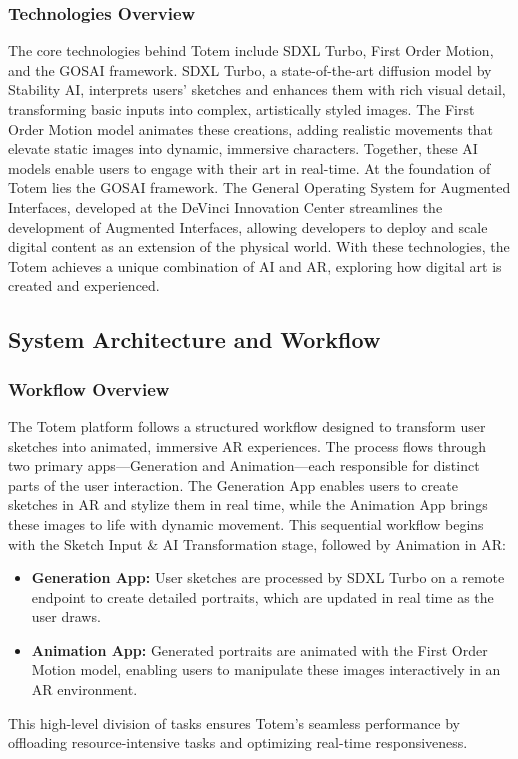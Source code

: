 \subsubsection{Technologies Overview}
The core technologies behind Totem include SDXL Turbo\cite{sauer2023adversarial}, First Order Motion\cite{Siarohin_2019_NeurIPS}, and the GOSAI framework\cite{gosai2022}.
SDXL Turbo, a state-of-the-art diffusion model by Stability AI, interprets users' sketches and enhances them with rich visual detail, transforming basic inputs into complex, artistically styled images.
The First Order Motion model animates these creations, adding realistic movements that elevate static images into dynamic, immersive characters.
Together, these AI models enable users to engage with their art in real-time.
At the foundation of Totem lies the GOSAI framework. The General Operating System for Augmented Interfaces, developed at the DeVinci Innovation Center streamlines the development of Augmented Interfaces, allowing developers to deploy and scale digital content as an extension of the physical world.
With these technologies, the Totem achieves a unique combination of AI and AR, exploring how digital art is created and experienced.

\subsection{ System Architecture and Workflow }

\subsubsection{Workflow Overview}
The Totem platform follows a structured workflow designed to transform user sketches into animated, immersive AR experiences.
The process flows through two primary apps—Generation and Animation—each responsible for distinct parts of the user interaction.
The Generation App enables users to create sketches in AR and stylize them in real time, while the Animation App brings these images to life with dynamic movement.
This sequential workflow begins with the Sketch Input & AI Transformation stage, followed by Animation in AR:

\begin{itemize}
    \item \textbf{Generation App:} User sketches are processed by SDXL Turbo on a remote endpoint to create detailed portraits, which are updated in real time as the user draws.
    \item  \textbf{Animation App:} Generated portraits are animated with the First Order Motion model, enabling users to manipulate these images interactively in an AR environment.
\end{itemize}
This high-level division of tasks ensures Totem’s seamless performance by offloading resource-intensive tasks and optimizing real-time responsiveness.

